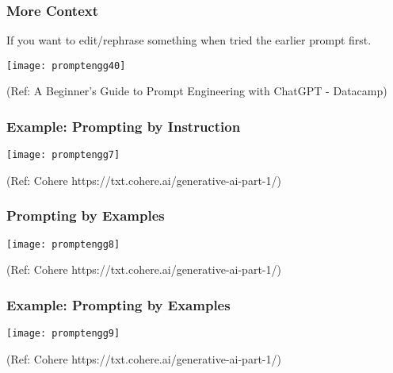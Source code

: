 \begin{frame}[fragile]\frametitle{More Context}

If you want to edit/rephrase something when tried the earlier prompt first.

\begin{center}
\texttt{[image: promptengg40]}

{\tiny (Ref: A Beginner's Guide to Prompt Engineering with ChatGPT - Datacamp)}
\end{center}		
		

\end{frame}

\begin{frame}[fragile]\frametitle{Example: Prompting by Instruction}

\begin{center}
\texttt{[image: promptengg7]}

{\tiny (Ref: Cohere https://txt.cohere.ai/generative-ai-part-1/)}

\end{center}		
		


\end{frame}

\begin{frame}[fragile]\frametitle{Prompting by Examples}

\begin{center}
\texttt{[image: promptengg8]}

{\tiny (Ref: Cohere https://txt.cohere.ai/generative-ai-part-1/)}

\end{center}		
		


\end{frame}

\begin{frame}[fragile]\frametitle{Example: Prompting by Examples}

\begin{center}
\texttt{[image: promptengg9]}

{\tiny (Ref: Cohere https://txt.cohere.ai/generative-ai-part-1/)}

\end{center}		
		
\end{frame}

